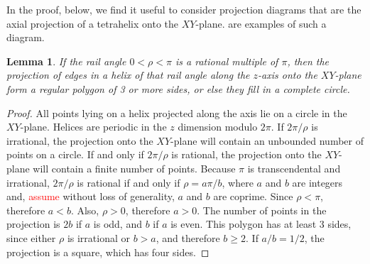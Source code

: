 \documentclass[twocolumn,10pt]{asme2ej}
\newtheorem{lemma}{Lemma}
\newcommand{\highlighttext}[1] {\textcolor{red}{#1}}
\begin{document}
In the proof, below, we find it useful to consider projection diagrams that are the axial projection
of a tetrahelix onto the $XY$-plane.  are examples
of such a diagram.
\begin{lemma}
  If the rail angle $0 < \rho < \pi$ is a rational multiple of $\pi$, then the projection of
  edges in a helix of that rail angle  along the $z$-axis onto the $XY$-plane form a
  regular polygon of 3 or more sides, or else they fill in a complete circle.
  \label{lemma:ngon}
\end{lemma}
\begin{proof}
  All points lying on a helix projected along the axis lie on a circle in the $XY$-plane.
  Helices are periodic in the $z$ dimension modulo $2\pi$.
  If $2\pi/\rho$ is irrational, the projection onto the $XY$-plane will contain
  an unbounded number of points on a circle.
  If and only if $2\pi/\rho$ is rational, the projection onto
  the $XY$-plane will contain a finite number of points.
  Because $\pi$ is transcendental and irrational,
  $2\pi/\rho$ is rational if and only if $\rho = a\pi/b$, where $a$ and $b$ are integers
  and, \highlighttext{assume} without loss of generality, $a$ and $b$ are coprime.
  Since $\rho < \pi$, therefore $a < b$. Also, $\rho > 0$, therefore $a > 0$.
  The number of points in the projection is $2b$ if $a$ is odd, and $b$ if $a$ is even.
  This polygon has at least 3 sides, since either $\rho$ is irrational or $b > a$, and therefore
  $b \geq 2$. If $a/b = 1/2$, the projection is a square, which has four sides. 
\end{proof}
\end{document}
